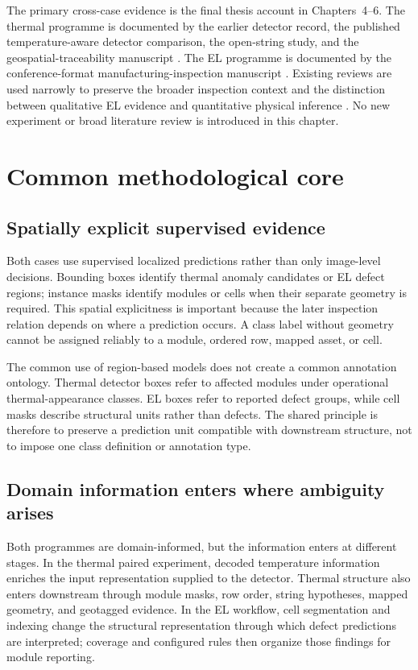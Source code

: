 \documentclass[12pt,a4paper]{report}
\begin{document}
The primary cross-case evidence is the final thesis account in Chapters~4--6. The thermal programme is documented by the earlier detector record, the published temperature-aware detector comparison, the open-string study, and the geospatial-traceability manuscript \citep{src001,src003,src004,src005}. The EL programme is documented by the conference-format manufacturing-inspection manuscript \citep{src002}. Existing reviews are used narrowly to preserve the broader inspection context and the distinction between qualitative EL evidence and quantitative physical inference \citep{src017,src018,src019}. No new experiment or broad literature review is introduced in this chapter.

\section{Common methodological core}
\label{sec:ch07-common-core}

\subsection{Spatially explicit supervised evidence}

Both cases use supervised localized predictions rather than only image-level decisions. Bounding boxes identify thermal anomaly candidates or EL defect regions; instance masks identify modules or cells when their separate geometry is required. This spatial explicitness is important because the later inspection relation depends on where a prediction occurs. A class label without geometry cannot be assigned reliably to a module, ordered row, mapped asset, or cell.

The common use of region-based models does not create a common annotation ontology. Thermal detector boxes refer to affected modules under operational thermal-appearance classes. EL boxes refer to reported defect groups, while cell masks describe structural units rather than defects. The shared principle is therefore to preserve a prediction unit compatible with downstream structure, not to impose one class definition or annotation type.

\subsection{Domain information enters where ambiguity arises}

Both programmes are domain-informed, but the information enters at different stages. In the thermal paired experiment, decoded temperature information enriches the input representation supplied to the detector. Thermal structure also enters downstream through module masks, row order, string hypotheses, mapped geometry, and geotagged evidence. In the EL workflow, cell segmentation and indexing change the structural representation through which defect predictions are interpreted; coverage and configured rules then organize those findings for module reporting.
\end{document}
